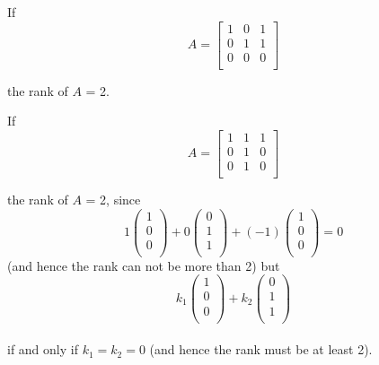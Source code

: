 \documentclass[12pt,a4paper]{article}
\theoremstyle{regla}
\theoremstyle{remark}
\theoremstyle{definition}
\theoremstyle{nonumberbreak}
\begin{document}
\begin{xmpl}


 If \[A = 
  \left[ 
   \begin{array}{ccc}
     1 & 0 & 1 \\
     0 & 1 & 1\\
     0 & 0 & 0 \\
   \end{array}
  \right]\]

the rank of  $A$ = 2.
\end{xmpl}

\begin{xmpl}

 If \[ A = 
  \left[ 
   \begin{array}{ccc}
     1 & 1 & 1 \\
     0 & 1 & 0 \\
     0 & 1 & 0 \\
   \end{array}
  \right]\]

the rank of  $A$ = 2,
since  
\[  1
  \left(
   \begin{array}{ccc}
     1 \\
     0 \\
     0 \\
   \end{array}
  \right) +  0
  \left(
   \begin{array}{ccc}
     0 \\
     1 \\
     1 \\
   \end{array}
  \right) + (-1)
  \left(
    \begin{array}{ccc}
      1 \\
      0 \\
      0 \\
    \end{array}
   \right) = 0 \] 
(and hence the rank can not be more than 2) 
but  
\[  k_1
  \left(
   \begin{array}{ccc}
     1 \\
     0 \\
     0 \\
   \end{array}
  \right) +  k_2
  \left(
   \begin{array}{ccc}
     0 \\
     1 \\
     1 \\
   \end{array}
  \right)\] \\ if and only if $k_1=k_2=0$ (and hence the rank must be at least 2).
\end{xmpl}
\end{document}
